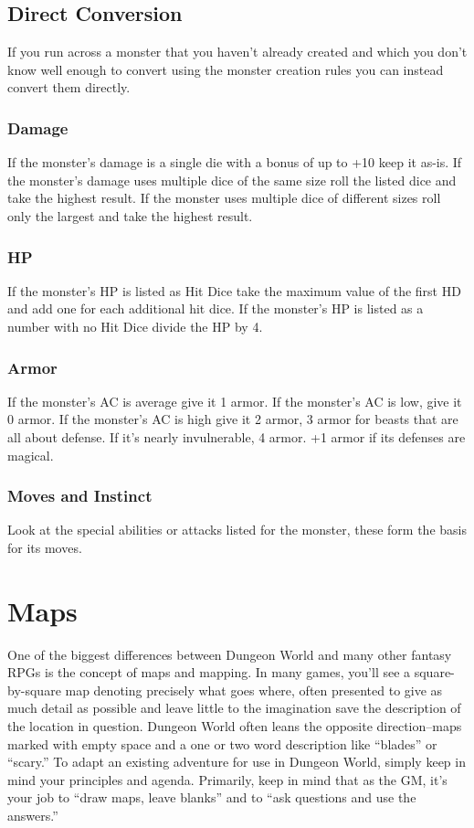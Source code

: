 \subsection{Direct Conversion}


If you run across a monster that you haven't already created and which you don't know well enough to convert using the monster creation rules you can instead convert them directly.
\subsubsection{Damage}


If the monster's damage is a single die with a bonus of up to +10 keep it as-is. If the monster's damage uses multiple dice of the same size roll the listed dice and take the highest result. If the monster uses multiple dice of different sizes roll only the largest and take the highest result.
\subsubsection{HP}


If the monster's HP is listed as Hit Dice take the maximum value of the first HD and add one for each additional hit dice. If the monster's HP is listed as a number with no Hit Dice divide the HP by 4.
\subsubsection{Armor}


If the monster's AC is average give it 1 armor. If the monster's AC is low, give it 0 armor. If the monster's AC is high give it 2 armor, 3 armor for beasts that are all about defense. If it's nearly invulnerable, 4 armor. +1 armor if its defenses are magical.
\subsubsection{Moves and Instinct}


Look at the special abilities or attacks listed for the monster, these form the basis for its moves. 
\section*{Maps}


One of the biggest differences between Dungeon World and many other fantasy RPGs is the concept of maps and mapping. In many games, you'll see a square-by-square map denoting precisely what goes where, often presented to give as much detail as possible and leave little to the imagination save the description of the location in question. Dungeon World often leans the opposite direction--maps marked with empty space and a one or two word description like ``blades'' or ``scary.'' To adapt an existing adventure for use in Dungeon World, simply keep in mind your principles and agenda. Primarily, keep in mind that as the GM, it's your job to ``draw maps, leave blanks'' and to ``ask questions and use the answers.''


